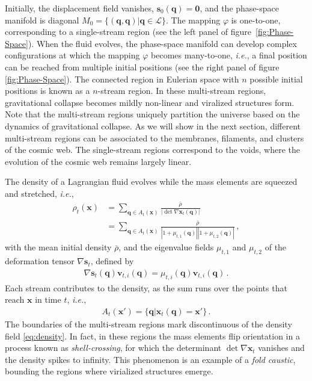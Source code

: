 \documentclass[a4paper, 11pt]{article}
\begin{document}
Initially, the displacement field vanishes, $\bm{s}_0(\bm{q})=\bm{0}$, and the phase-space manifold is diagonal $M_0=\{(\bm{q},\bm{q})|\bm{q} \in \mathcal{L}\}$. The mapping $\varphi$ is one-to-one, corresponding to a single-stream region (see the left panel of figure\ \ref{fig:Phase-Space}). When the fluid evolves, the phase-space manifold can develop complex configurations at which the mapping $\varphi$ becomes many-to-one, \textit{i.e.}, a final position can be reached from multiple initial positions (see the right panel of figure \ref{fig:Phase-Space}). The connected region in Eulerian space with $n$ possible initial positions is known as a $n$-stream region. In these multi-stream regions, gravitational collapse becomes mildly non-linear and viralized structures form. Note that the multi-stream regions uniquely partition the universe based on the dynamics of gravitational collapse. As we will show in the next section, different multi-stream regions can be associated to the membranes, filaments, and clusters of the cosmic web. The single-stream regions correspond to the voids, where the evolution of the cosmic web remains largely linear.

The density of a Lagrangian fluid evolves while the mass elements are squeezed and stretched, \textit{i.e.},
\begin{align}
\rho_t(\bm{x})
&= \sum_{\bm{q} \in A_t(\bm{x})} \frac{\bar{\rho}}{|\det \nabla \bm{x}_t(\bm{q})|}\\
&= \sum_{\bm{q} \in A_t(\bm{x})} \frac{\bar{\rho}}{|1+\mu_{t,1}(\bm{q})||1+\mu_{t,2}(\bm{q})|}\,,
\label{eq:density}
\end{align}
with the mean initial density $\bar{\rho}$, and the eigenvalue fields $\mu_{t,1}$ and $\mu_{t,2}$ of the deformation tensor $\nabla \bm{s}_t$, defined by
\begin{align}
\nabla \bm{s}_t(\bm{q}) \bm{v}_{t,i}(\bm{q}) = \mu_{t,i}(\bm{q}) \bm{v}_{t,i}(\bm{q})\,.
\end{align} 
Each stream contributes to the density, as the sum runs over the points that reach $\bm{x}$ in time $t$, \textit{i.e.},
\begin{align}
A_t(\bm{x}') = \{\bm{q}|\bm{x}_t(\bm{q})=\bm{x}'\}\,.
\end{align}
The boundaries of the multi-stream regions mark discontinuous of the density field \eqref{eq:density}. In fact, in these regions the mass elements flip orientation in a process known as \textit{shell-crossing}, for which the determinant $\det \nabla \bm{x}_t$ vanishes and the density spikes to infinity. This phenomenon is an example of a \textit{fold caustic}, bounding the regions where virialized structures emerge.
\end{document}
